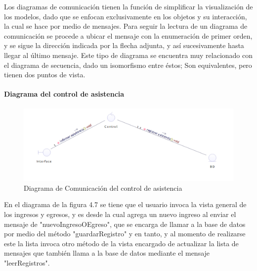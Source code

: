 Los diagramas de comunicación tienen la función de simplificar la visualización de los modelos, dado que se enfocan exclusivamente en los objetos y su interacción, la cual se hace por medio de mensajes. Para seguir la lectura de un diagrama de comunicación se procede a ubicar el mensaje con la enumeración de primer orden, y se sigue la dirección indicada por la flecha adjunta, y así sucesivamente hasta llegar al último mensaje. Este tipo de diagrama se encuentra muy relacionado con el diagrama de secuencia, dado un isomorfismo entre éstos; Son equivalentes, pero tienen dos puntos de vista.


\paragraph{Diagrama del control de asistencia}
\begin{figure}[H]
	\centering
	\includegraphics[width=1\linewidth]{parte2/imgs/DiagramaComunicacion/ComAsist}
	\caption[Diagrama de Comunicacion Control de asistencia]{Diagrama de Comunicación del control de asistencia}
	\label{fig:diagramaDeComunicacion}
\end{figure}

En el diagrama de la figura 4.7 se tiene que el usuario invoca la vista general de los ingresos y egresos, y es desde la cual agrega un nuevo ingreso al enviar el mensaje de "nuevoIngresoOEgreso", que se encarga de llamar a la base de datos por medio del método "guardarRegistro" y en tanto, y al momento de realizarse este la lista invoca otro método de la vista encargado de actualizar la lista de mensajes que también llama a la base de datos mediante el mensaje "leerRegistros".\newline%

